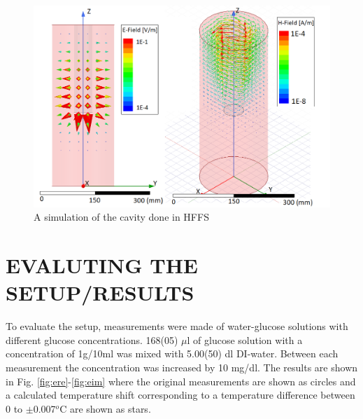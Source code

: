 \documentclass[10pt,final,conference,a4paper,twocolumn]{IEEEtran_AntennEMB_GigaHertz2016}
\begin{document}
\begin{figure}[b]
 	\centering
 	\includegraphics[width=1.0\columnwidth]{EHfield.png}
 	\caption{A simulation of the cavity done in HFFS}
 	\label{fig:sim}
 \end{figure}
\section{EVALUTING THE SETUP/RESULTS}
To evaluate the setup, measurements were made of water-glucose solutions with different glucose concentrations. 168(05) $\mu$l of glucose solution with a concentration of 1g/10ml was mixed with 5.00(50) dl DI-water. Between each measurement the concentration was increased by 10 mg/dl. The results are shown in Fig. \ref{fig:ere}-\ref{fig:eim} where the original measurements are shown as circles and a calculated temperature shift corresponding to a temperature difference between 0 to $\pm$0.007$^o$C are shown as stars.
\end{document}
